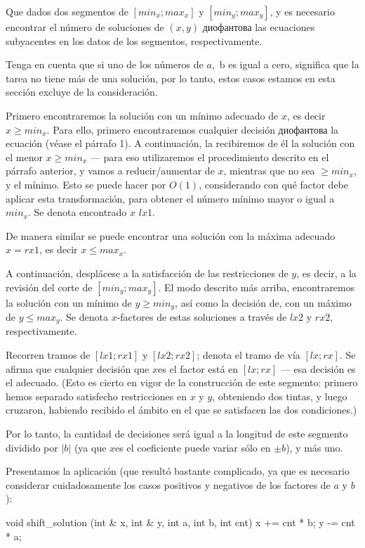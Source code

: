 Que dados dos segmentos de $[min_x;max_x]$ y $[min_y;max_y]$, y es necesario encontrar el número de soluciones de $(x,y)$ диофантова las ecuaciones subyacentes en los datos de los segmentos, respectivamente.

Tenga en cuenta que si uno de los números de $a,$ b es igual a cero, significa que la tarea no tiene más de una solución, por lo tanto, estos casos estamos en esta sección excluye de la consideración.

Primero encontraremos la solución con un mínimo adecuado de $x$, es decir $x \ge min_x$. Para ello, primero encontraremos cualquier decisión диофантова la ecuación (véase el párrafo 1). A continuación, la recibiremos de él la solución con el menor $x \ge min_x$ --- para eso utilizaremos el procedimiento descrito en el párrafo anterior, y vamos a reducir/aumentar de $x$, mientras que no sea $\ge min_x$, y el mínimo. Esto se puede hacer por $O(1)$, considerando con qué factor debe aplicar esta transformación, para obtener el número mínimo mayor o igual a $min_x$. Se denota encontrado $x$ $lx1$.

De manera similar se puede encontrar una solución con la máxima adecuado $x=rx1$, es decir $x \le max_x$.

A continuación, desplácese a la satisfacción de las restricciones de $y$, es decir, a la revisión del corte de $[min_y;max_y]$. El modo descrito más arriba, encontraremos la solución con un mínimo de $y \ge min_y$, así como la decisión de, con un máximo de $y \le max_y$. Se denota $x$-factores de estas soluciones a través de $lx2$ y $rx2$, respectivamente.

Recorren tramos de $[lx1;rx1]$ y $[lx2;rx2]$; denota el tramo de vía $[lx;rx]$. Se afirma que cualquier decisión que $x$es el factor está en $[lx;rx]$ --- esa decisión es el adecuado. (Esto es cierto en vigor de la construcción de este segmento: primero hemos separado satisfecho restricciones en $x$ y $y$, obteniendo dos tintas, y luego cruzaron, habiendo recibido el ámbito en el que se satisfacen las dos condiciones.)

Por lo tanto, la cantidad de decisiones será igual a la longitud de este segmento dividido por $|b|$ (ya que $x$es el coeficiente puede variar sólo en $\pm b$), y más uno.

Presentamos la aplicación (que resultó bastante complicado, ya que es necesario considerar cuidadosamente los casos positivos y negativos de los factores de $a$ y $b$):

\code
void shift_solution (int & x, int & y, int a, int b, int cnt) {
x += cnt * b;
 y -= cnt * a;
}

